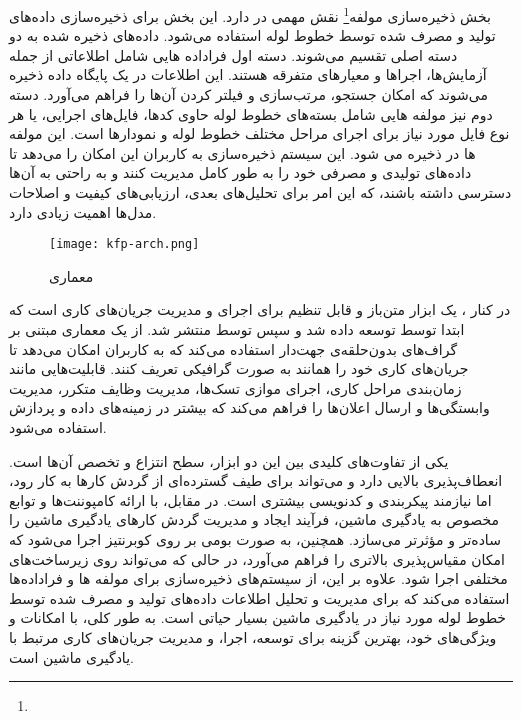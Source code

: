 بخش ذخیره‌سازی مولفه\footnote{} نقش مهمی در  دارد. این بخش برای ذخیره‌سازی داده‌های تولید و مصرف شده توسط خطوط لوله استفاده می‌شود. داده‌های ذخیره شده به دو دسته اصلی تقسیم می‌شوند. دسته اول فراداده هایی  شامل اطلاعاتی از جمله آزمایش‌ها، اجراها و معیارهای متفرقه هستند. این اطلاعات در یک پایگاه داده  ذخیره می‌شوند که امکان جستجو، مرتب‌سازی و فیلتر کردن آن‌ها را فراهم می‌آورد. دسته دوم نیز مولفه هایی شامل بسته‌های خطوط لوله حاوی کدها، فایل‌های اجرایی، یا هر نوع فایل مورد نیاز برای اجرای مراحل مختلف خطوط لوله و نمودارها است. این مولفه ها در  ذخیره می شود. این سیستم ذخیره‌سازی به کاربران این امکان را می‌دهد تا داده‌های تولیدی و مصرفی خود را به طور کامل مدیریت کنند و به راحتی به آن‌ها دسترسی داشته باشند، که این امر برای تحلیل‌های بعدی، ارزیابی‌های کیفیت و اصلاحات مدل‌ها اهمیت زیادی دارد.

\begin{figure}[t]
	\centering
	\texttt{[image: kfp-arch.png]}
	\caption{معماری }
	\label{fig: kfp arch}
\end{figure} 

در کنار ،
  یک ابزار متن‌باز و قابل تنظیم برای اجرای و مدیریت جریان‌های کاری است که ابتدا توسط  توسعه داده شد و سپس توسط  منتشر شد.  از یک معماری مبتنی بر گراف‌های بدون‌حلقه‌ی جهت‌دار استفاده می‌کند که به کاربران امکان می‌دهد تا جریان‌های کاری خود را همانند  به صورت گرافیکی تعریف کنند.  قابلیت‌هایی مانند زمان‌بندی مراحل کاری، اجرای موازی تسک‌ها، مدیریت وظایف متکرر، مدیریت وابستگی‌ها و ارسال اعلان‌ها را فراهم می‌کند که بیشتر در زمینه‌های داده و پردازش  استفاده می‌شود. 
  
 یکی از تفاوت‌های کلیدی بین این دو ابزار، سطح انتزاع و تخصص آن‌ها است.  انعطاف‌پذیری بالایی دارد و می‌تواند برای طیف گسترده‌ای از گردش کارها به کار رود، اما نیازمند پیکربندی و کدنویسی بیشتری است. در مقابل،  با ارائه کامپوننت‌ها و توابع مخصوص به یادگیری ماشین، فرآیند ایجاد و مدیریت گردش کارهای یادگیری ماشین را ساده‌تر و مؤثرتر می‌سازد. همچنین،  به صورت بومی بر روی کوبرنتیز اجرا می‌شود که امکان مقیاس‌پذیری بالاتری را فراهم می‌آورد، در حالی که  می‌تواند روی زیرساخت‌های مختلفی اجرا شود. علاوه بر این،  از سیستم‌های ذخیره‌سازی برای مولفه ها و فراداده‌ها استفاده می‌کند که برای مدیریت و تحلیل اطلاعات داده‌های تولید و مصرف شده توسط خطوط لوله مورد نیاز در یادگیری ماشین بسیار حیاتی است. به طور کلی،  با امکانات و ویژگی‌های خود، بهترین گزینه برای توسعه، اجرا، و مدیریت جریان‌های کاری مرتبط با یادگیری ماشین است.
 







